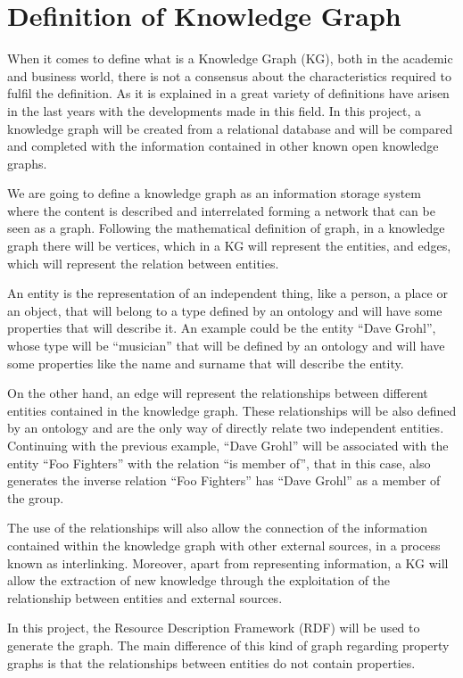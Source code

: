 \section{Definition of Knowledge Graph}
When it comes to define what is a Knowledge Graph (KG), both in the academic and business world, there is not a consensus about the characteristics required to fulfil the definition.
As it is explained in \citet{Ehrlinger2016} a great variety of definitions have arisen in the last years with the developments made in this field.
In this project, a knowledge graph will be created from a relational database and will be compared and completed with the information contained in other known open knowledge graphs. 

We are going to define a knowledge graph as an information storage system where the content is described and interrelated forming a network that can be seen as a graph.
Following the mathematical definition of graph, in a knowledge graph there will be vertices, which in a KG will represent the entities, and edges, which will represent the relation between entities.  

An entity is the representation of an independent thing, like a person, a place or an object, that will belong to a type defined by an ontology and will have some properties that will describe it.
An example could be the entity ``Dave Grohl'', whose type will be ``musician'' that will be defined by an ontology and will have some properties like the name and surname that will describe the entity. 

On the other hand, an edge will represent the relationships between different entities contained in the knowledge graph.
These relationships will be also defined by an ontology and are the only way of directly relate two independent entities.
Continuing with the previous example, ``Dave Grohl'' will be associated with the entity ``Foo Fighters'' with the relation ``is member of'', that in this case, also generates the inverse relation ``Foo Fighters'' has ``Dave Grohl'' as a member of the group. 

The use of the relationships will also allow the connection of the information contained within the knowledge graph with other external sources, in a process known as interlinking.
Moreover, apart from representing information, a KG will allow the extraction of new knowledge through the exploitation of the relationship between entities and external sources. 

In this project, the Resource Description Framework (RDF) will be used to generate the graph.
The main difference of this kind of graph regarding property graphs is that the relationships between entities do not contain properties.  